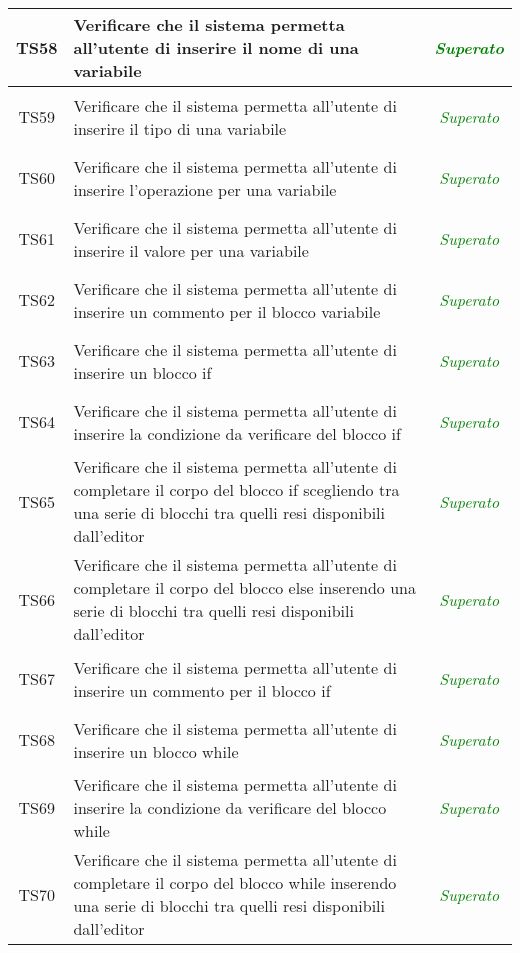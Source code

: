 \begin{longtable}{|c|>{}m{8cm}|c|}
\hypertarget{TS58}{TS58} & Verificare che il sistema permetta all'utente di inserire il nome di una variabile & \textcolor{Green}{\textit{Superato}}\\ \hline
\hypertarget{TS59}{TS59} & Verificare che il sistema permetta all'utente di inserire il tipo di una variabile& \textcolor{Green}{\textit{Superato}}\\ \hline
\hypertarget{TS60}{TS60} & Verificare che il sistema permetta all'utente di inserire l'operazione per una variabile& \textcolor{Green}{\textit{Superato}}\\ \hline
\hypertarget{TS61}{TS61} & Verificare che il sistema permetta all'utente di inserire il valore per una variabile& \textcolor{Green}{\textit{Superato}}\\ \hline
\hypertarget{TS62}{TS62} & Verificare che il sistema permetta all'utente di inserire un commento per il blocco variabile & \textcolor{Green}{\textit{Superato}}\\ \hline
\hypertarget{TS63}{TS63} & Verificare che il sistema permetta all'utente di inserire un blocco if & \textcolor{Green}{\textit{Superato}}\\ \hline
\hypertarget{TS64}{TS64} & Verificare che il sistema permetta all'utente di inserire la condizione da verificare del blocco if & \textcolor{Green}{\textit{Superato}}\\ \hline
\hypertarget{TS4.3.2}{TS65} & Verificare che il sistema permetta all'utente di completare il corpo del blocco if scegliendo tra una serie di blocchi tra quelli resi disponibili dall'editor & \textcolor{Green}{\textit{Superato}}\\ \hline
\hypertarget{TS4.3.3}{TS66} & Verificare che il sistema permetta all'utente di completare il corpo del blocco else inserendo una serie di blocchi tra quelli resi disponibili dall'editor & \textcolor{Green}{\textit{Superato}}\\ \hline
\hypertarget{TS4.3.4}{TS67} & Verificare che il sistema permetta all'utente di inserire un commento per il blocco if & \textcolor{Green}{\textit{Superato}}\\ \hline
\hypertarget{TS4.4}{TS68} & Verificare che il sistema permetta all'utente di inserire un blocco while & \textcolor{Green}{\textit{Superato}}\\ \hline
\hypertarget{TS4.4.1}{TS69} & Verificare che il sistema permetta all'utente di inserire la condizione da verificare del blocco while & \textcolor{Green}{\textit{Superato}}\\ \hline
\hypertarget{TS4.4.2}{TS70} & Verificare che il sistema permetta all'utente di completare il corpo del blocco while inserendo una serie di blocchi tra quelli resi disponibili dall'editor & \textcolor{Green}{\textit{Superato}}\\ \hline

\end{longtable}
